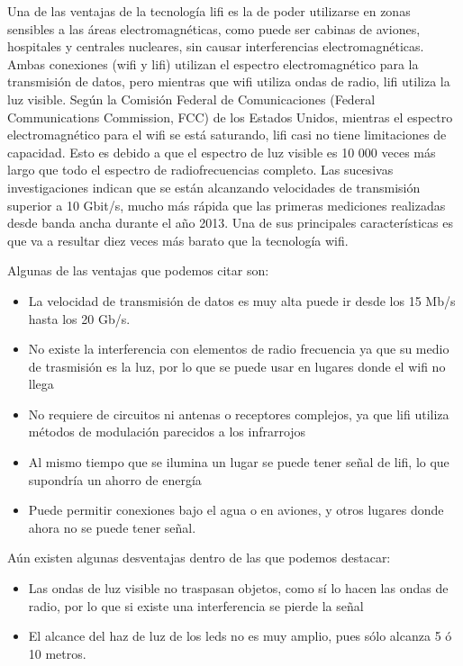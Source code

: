 \documentclass[a4paper]{article}
\begin{document}
Una de las ventajas de la tecnología lifi es la de poder utilizarse en
zonas sensibles a las áreas electromagnéticas, como puede ser cabinas de
aviones, hospitales y centrales nucleares, sin causar interferencias
electromagnéticas. Ambas conexiones (wifi y lifi) utilizan el espectro
electromagnético para la transmisión de datos, pero mientras que wifi
utiliza ondas de radio, lifi utiliza la luz visible. Según la Comisión
Federal de Comunicaciones (Federal Communications Commission, FCC) de
los Estados Unidos, mientras el espectro electromagnético para el wifi
se está saturando, lifi casi no tiene limitaciones de capacidad. Esto es
debido a que el espectro de luz visible es 10 000 veces más largo que
todo el espectro de radiofrecuencias completo. Las sucesivas
investigaciones indican que se están alcanzando velocidades de
transmisión superior a 10 Gbit/s, mucho más rápida que las primeras
mediciones realizadas desde banda ancha durante el año 2013. Una de sus
principales características es que va a resultar diez veces más barato
que la tecnología wifi.

Algunas de las ventajas que podemos citar son:

\begin{itemize}
\item
  La velocidad de transmisión de datos es muy alta puede ir desde los 15
  Mb/s hasta los 20 Gb/s.
\item
  No existe la interferencia con elementos de radio frecuencia ya que su
  medio de trasmisión es la luz, por lo que se puede usar en lugares
  donde el wifi no llega
\item
  No requiere de circuitos ni antenas o receptores complejos, ya que
  lifi utiliza métodos de modulación parecidos a los infrarrojos
\item
  Al mismo tiempo que se ilumina un lugar se puede tener señal de lifi,
  lo que supondría un ahorro de energía
\item
  Puede permitir conexiones bajo el agua o en aviones, y otros lugares
  donde ahora no se puede tener señal.
\end{itemize}

Aún existen algunas desventajas dentro de las que podemos destacar:

\begin{itemize}
\item
  Las ondas de luz visible no traspasan objetos, como sí lo hacen las
  ondas de radio, por lo que si existe una interferencia se pierde la
  señal
\item
  El alcance del haz de luz de los leds no es muy amplio, pues sólo
  alcanza 5 ó 10 metros.
\end{itemize}
\end{document}
